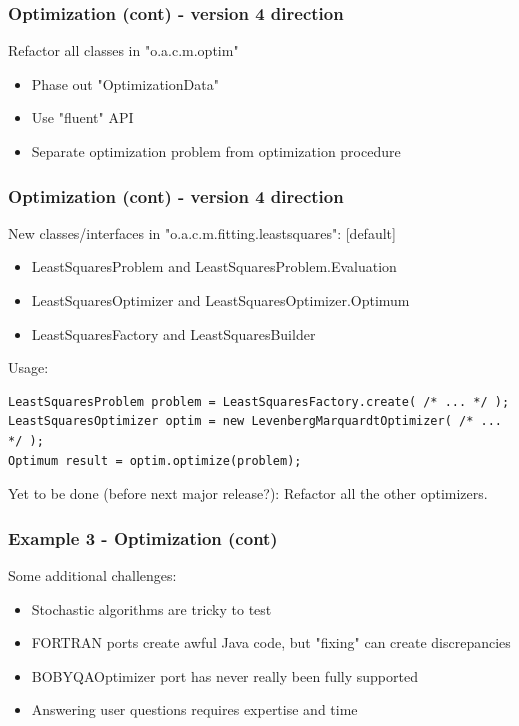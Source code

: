 \documentclass[14pt,mathserif]{beamer}
\begin{document}
\begin{frame}
  \frametitle{Optimization (cont) - version 4 direction}

Refactor all classes in "o.a.c.m.optim"

\begin{itemize}
\item Phase out "OptimizationData"
\item Use "fluent" API
\item Separate optimization problem from optimization procedure
\end{itemize}
\end{frame}

\begin{frame}[fragile]
  \frametitle{Optimization (cont) - version 4 direction}
  
\begin{small}
New classes/interfaces in "o.a.c.m.fitting.leastsquares":
[default]
\begin{itemize}
\item LeastSquaresProblem and LeastSquaresProblem.Evaluation
\item LeastSquaresOptimizer and LeastSquaresOptimizer.Optimum
\item LeastSquaresFactory and LeastSquaresBuilder
\end{itemize}
Usage:
\begin{verbatim}
LeastSquaresProblem problem = LeastSquaresFactory.create( /* ... */ );
LeastSquaresOptimizer optim = new LevenbergMarquardtOptimizer( /* ... */ );
Optimum result = optim.optimize(problem);
\end{verbatim}

Yet to be done (before next major release?): Refactor all the other optimizers. 
\end{small}
\end{frame}
\begin{frame}[fragile]
  \frametitle{Example 3 - Optimization (cont)}

Some additional challenges:

\begin{small}
\begin{itemize}
\item Stochastic algorithms are tricky to test
\item FORTRAN ports create awful Java code, but "fixing" can create discrepancies
\item BOBYQAOptimizer port has never really been fully supported
\item Answering user questions requires expertise and time
\end{itemize} 
\end{small}
\end{frame}
\end{document}
